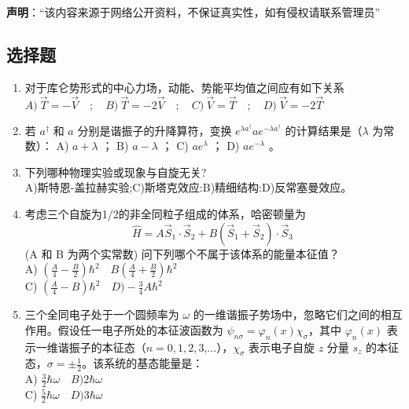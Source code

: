 
\textbf{声明}：“该内容来源于网络公开资料，不保证真实性，如有侵权请联系管理员”

\subsection{选择题}
\begin{enumerate}
\item 对于库仑势形式的中心力场，动能、势能平均值之间应有如下关系
$A) \ \vec{T} = -\vec{V} \quad ; \quad B) \ \vec{T} = -2\vec{V} \quad ; \quad 
C) \ \vec{V} = \vec{T} \quad ; \quad D) \ \vec{V} = -2\vec{T} $
\item 若 $a^{\dagger}$ 和 $a$ 分别是谐振子的升降算符，变换 $e^{\lambda a^{\dagger}} a e^{-\lambda a^{\dagger}}$ 的计算结果是（$\lambda$ 为常数）：
A) $a + \lambda$ ； B) $a - \lambda$ ； C) $a e^{\lambda}$ ； D) $a e^{-\lambda}$ 。
\item 下列哪种物理实验或现象与自旋无关?\\
A)斯特恩-盖拉赫实验;C)斯塔克效应:B)精细结构:D)反常塞曼效应。
\item 考虑三个自旋为1/2的非全同粒子组成的体系，哈密顿量为
$$\hat{H} = A \vec{S}_1 \cdot \vec{S}_2 + B (\vec{S}_1 + \vec{S}_2) \cdot \vec{S}_3~$$(A 和 B 为两个实常数)
问下列哪个不属于该体系的能量本征值？\\
A) $\left(\frac{A}{4} - \frac{B}{2}\right)\hbar^2 \quad B \left(\frac{A}{4} + \frac{B}{2}\right)\hbar^2$\\
C) $\left(\frac{A}{4} - B\right)\hbar^2 \quad D)  -\frac{3}{4}A \hbar^2$
\item 三个全同电子处于一个圆频率为 $\omega$ 的一维谐振子势场中，忽略它们之间的相互作用。假设任一电子所处的本征波函数为 $\psi_{n\sigma }= \varphi_{n}(x) \chi_{\sigma}$，其中 $\varphi_{n}(x)$ 表示一维谐振子的本征态（$n = 0,1,2,3$,...），$\chi_{\sigma}$ 表示电子自旋 $z$ 分量 $s_z$ 的本征态，$\sigma = \pm \frac{1}{2}$。该系统的基态能量是：\\
A) $\frac{3}{2}\hbar\omega \quad B)2\hbar\omega$\\
C) $\frac{5}{2}\hbar\omega \quad D) 3\hbar\omega$
\end{enumerate}

